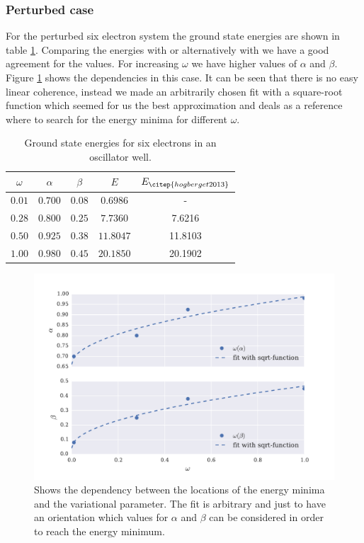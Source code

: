 \subsubsection{Perturbed case}\label{sec:perturbed_six}
For the perturbed six electron system the ground state energies are shown in table \ref{tab:groundstate_sixelectron}. Comparing the energies with \citet{hogberget2013} or alternatively with \citet{lohne2011} we have a good agreement for the values. For increasing $\omega$ we have higher values of $\alpha$ and $\beta$. Figure \ref{fig:alpha_beta_omega} shows the dependencies in this case. It can be seen that there is no easy linear coherence, instead we made an arbitrarily chosen fit with a square-root function which seemed for us the best approximation and deals as a reference where to search for the energy minima for different $\omega$. 
\begin{table}
    \centering
    \caption{Ground state energies for six electrons in an oscillator well.}
    \begin{tabular}{c|cc|c|c}
    \toprule
    $\omega$   & $\alpha$    & $\beta$ &    $E$  & $E_{\citep{hogberget2013}}$  \\ 
    \midrule
    $0.01$     & $0.700$       & $0.08$  & $0.6986$ & - \\
    $0.28$     & $0.800$       & $0.25$  & $7.7360$  & 7.6216 \\
    $0.50$      & $0.925$	    & $0.38$  & $11.8047$ & 11.8103 \\
    $1.00$     & $0.980$      & $0.45$  & $20.1850$ & 20.1902 \\
    \bottomrule
    \end{tabular}
    \label{tab:groundstate_sixelectron}
\end{table}
\begin{figure}[htbp]
    \centering
    \includegraphics[scale=0.7]{alpha_beta_omega.pdf}
    \caption{Shows the dependency between the locations of the energy minima and the variational parameter. The fit is arbitrary and just to have an orientation which values for $\alpha$ and $\beta$ can be considered in order to reach the energy minimum.}
    \label{fig:alpha_beta_omega}
\end{figure}


